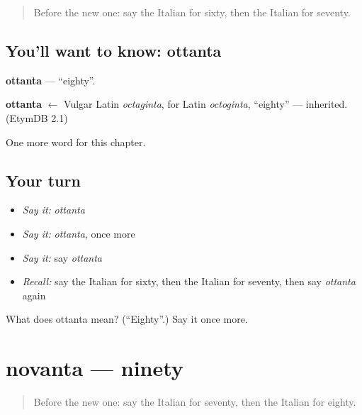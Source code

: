 \label{lesson:IT-C132-ottanta}



\begin{quote}
Before the new one: say the Italian for sixty, then the Italian for seventy.
\end{quote}

\subsection*{You'll want to know: ottanta}
\textbf{ottanta} — \textquotedblleft{}eighty\textquotedblright{}.

\begin{cousinweb}
\textbf{ottanta} $\leftarrow$ Vulgar Latin \emph{octaginta}, for Latin \emph{octoginta}, \textquotedblleft{}eighty\textquotedblright{} — inherited. (EtymDB 2.1)
\end{cousinweb}

\begin{grammarlens}[title={What you've built}]
One more word for this chapter.
\end{grammarlens}

\subsection*{Your turn}
\begin{itemize}
\raggedright
  \item \emph{Say it:} \emph{ottanta}
  \item \emph{Say it:} \emph{ottanta}, once more
  \item \emph{Say it:} say \emph{ottanta}
  \item \emph{Recall:} say the Italian for sixty, then the Italian for seventy, then say \emph{ottanta} again
\end{itemize}

\begin{tcolorbox}[breakable,colback=teal!4,colframe=teal!35!black,title={Before you move on}]
What does ottanta mean? (\textquotedblleft{}Eighty\textquotedblright{}.) Say it once more.
\end{tcolorbox}
\section[novanta]{novanta — ninety}

\label{lesson:IT-C132-novanta}



\begin{quote}
Before the new one: say the Italian for seventy, then the Italian for eighty.
\end{quote}


